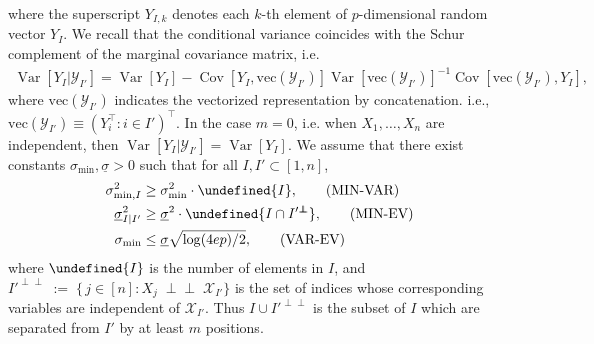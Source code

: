 \documentclass[10pt,a4paper]{amsart}
\newcommand{\violet}[1]{{\color{violet}#1}}
\newcommand{\commhb}[1]{{\textbf{{\violet{{[HB: #1]}}}}}}
\theoremstyle{plain}
\theoremstyle{remark}
\let\abs\undefined %
\DeclarePairedDelimiter\abs{\lvert}{\rvert}
\newcommand{\cmpl}{\mathsf{C}}
\newcommand{\indep}{{\perp\!\!\!\!\perp}}
\newcommand{\Var}{\operatorname{Var}}	%
\newcommand{\Cov}{\operatorname{Cov}}	%
\begin{document}
where the superscript $Y_{I,k}$ denotes each $k$-th element of $p$-dimensional random vector $Y_{I}$.
We recall that the conditional variance coincides with the Schur complement of the marginal covariance matrix, i.e.
\begin{equation*}
\begin{aligned}
    \Var[Y_{I}|\mathscr{Y}_{I'}] 
    = \Var[Y_{I}]
    - \Cov[Y_{I}, \mathrm{vec}(\mathscr{Y}_{I'})] \Var[\mathrm{vec}(\mathscr{Y}_{I'})]^{-1} \Cov[\mathrm{vec}(\mathscr{Y}_{I'}), Y_{I}],
\end{aligned}
\end{equation*}
where $\mathrm{vec}(\mathscr{Y}_{I'})$ indicates the vectorized representation by concatenation. i.e., $\mathrm{vec}(\mathscr{Y}_{I'}) \equiv (Y_i^\top: i \in I')^\top$. %
In the case $m=0$, i.e. when $X_1,\dots,X_n$ are independent, then 
$\Var[Y_{I}|\mathscr{Y}_{I'}] = \Var[Y_{I}].$
We assume that there exist constants $\sigma_{\min}, \underline{\sigma} > 0$ such that 
for all $I, I' \subset [1,n]$,
\begin{align}
    \sigma^2_{\min,I} & \geq \sigma^2_{\min} \cdot \abs{I}, 
    \label{assmp:min_var} \tag{MIN-VAR} \\
    \underline{\sigma}^2_{I|I'} & \geq \underline{\sigma}^2 \cdot \abs{I \cap I'^{\indep}}, 
    \label{assmp:min_ev} \tag{MIN-EV} \\
    \sigma_{\min} & \le \underline{\sigma} \sqrt{\log(4ep)/2},
    \label{assmp:var_ev}\tag{VAR-EV}
\end{align}
where $\abs{I}$ is the number of elements in $I$, and $I'^{\indep} \;:=\; \bigl\{\,j \in [n] : X_j \;\indep\; \mathscr{X}_{I'}\bigr\}$ is the set of indices whose corresponding variables are independent of $\mathscr{X}_{I'}$. Thus $I \cup I'^{\indep}$ is the subset of $I$ which are separated from $I'$ by at least $m$ positions. 
\end{document}
